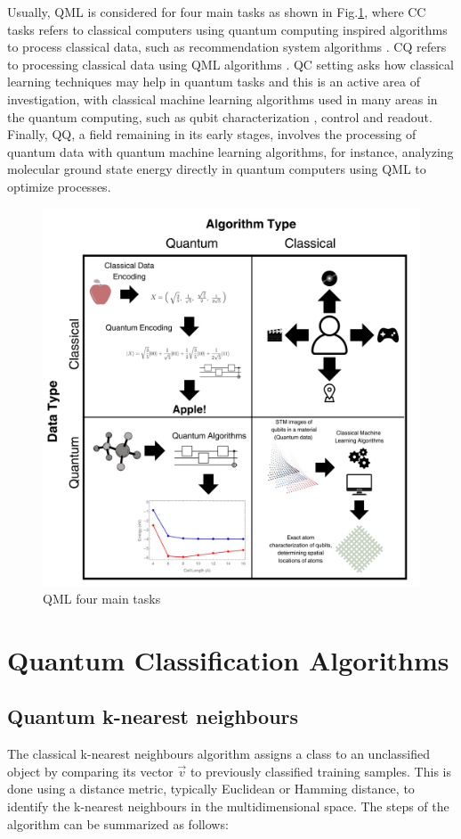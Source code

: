 \documentclass{article}
\begin{document}
Usually, QML is considered for four main tasks as shown in Fig.\ref{fig:qtasks}, where CC tasks refers to classical computers using quantum computing inspired algorithms to process classical data, such as recommendation system algorithms \cite{ccalg}. CQ refers to processing classical data using QML algorithms \cite{cq}. QC setting asks how classical learning techniques may
help in quantum tasks and this is an active area of investigation, with classical machine learning algorithms used in many areas in the quantum computing, such as qubit characterization \cite{charqc}, control \cite{controlqc} and readout\cite{readoutqc}. Finally, QQ, a field remaining in its early stages, involves the processing of quantum data with quantum machine learning algorithms, for instance, analyzing molecular ground state energy directly in quantum computers using QML to optimize processes.
\begin{figure}[h!]
    \centering
    \includegraphics[scale=0.19]{figures/QMLtypes.png}
    \caption{QML four main tasks}
    \label{fig:qtasks}
\end{figure}

\section*{Quantum Classification Algorithms}
\subsection*{Quantum k-nearest neighbours}
The classical k-nearest neighbours algorithm assigns a class to an unclassified object by comparing its vector $\vec{v}$ to previously classified training samples. This is done using a distance metric, typically Euclidean or Hamming distance, to identify the k-nearest neighbours in the multidimensional space. The steps of the algorithm can be summarized as follows:
\end{document}
